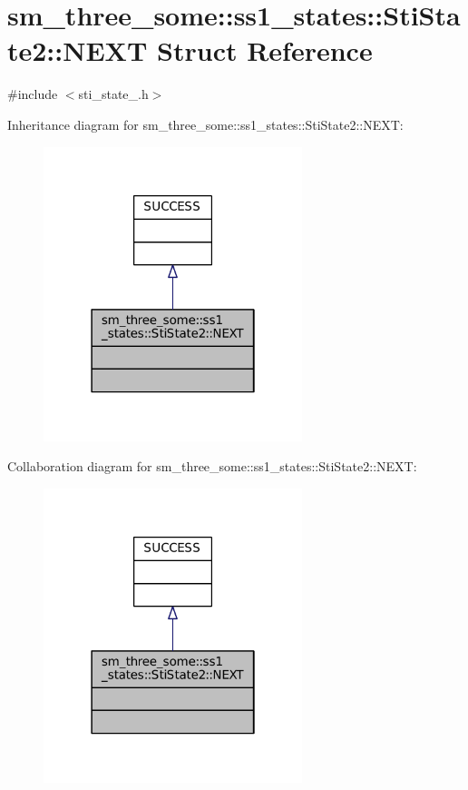 \hypertarget{structsm__three__some_1_1ss1__states_1_1StiState2_1_1NEXT}{}\section{sm\+\_\+three\+\_\+some\+:\+:ss1\+\_\+states\+:\+:Sti\+State2\+:\+:N\+E\+XT Struct Reference}
\label{structsm__three__some_1_1ss1__states_1_1StiState2_1_1NEXT}


{\ttfamily \#include $<$sti\+\_\+state\+\_.\+h$>$}



Inheritance diagram for sm\+\_\+three\+\_\+some\+:\+:ss1\+\_\+states\+:\+:Sti\+State2\+:\+:N\+E\+XT\+:
\nopagebreak
\begin{figure}[H]
\begin{center}
\leavevmode
\includegraphics[width=214pt]{structsm__three__some_1_1ss1__states_1_1StiState2_1_1NEXT__inherit__graph}
\end{center}
\end{figure}


Collaboration diagram for sm\+\_\+three\+\_\+some\+:\+:ss1\+\_\+states\+:\+:Sti\+State2\+:\+:N\+E\+XT\+:
\nopagebreak
\begin{figure}[H]
\begin{center}
\leavevmode
\includegraphics[width=214pt]{structsm__three__some_1_1ss1__states_1_1StiState2_1_1NEXT__coll__graph}
\end{center}
\end{figure}


